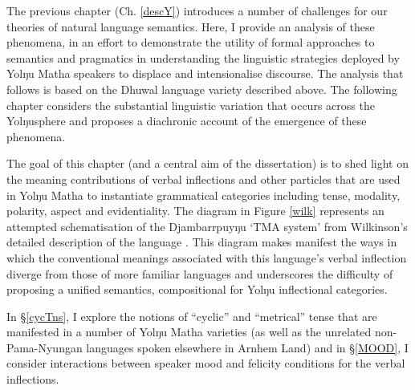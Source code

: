 \documentclass[11pt,dvipsnames]{report}
\date{}
\begin{document}
	
	The previous chapter (Ch. \ref{descY}) introduces a number of challenges for our theories of natural language semantics. Here, I provide an analysis of these phenomena, in an effort to demonstrate the utility of formal approaches to semantics and pragmatics in understanding the linguistic strategies deployed by Yolŋu Matha speakers to displace and intensionalise discourse. The analysis that follows is based on the Dhuwal language variety described above. The following chapter considers the substantial linguistic variation that occurs across the Yolŋusphere and proposes a diachronic account of the emergence of these phenomena.

The goal of this chapter (and a central aim of the dissertation) is to shed light on the meaning contributions of verbal inflections and other particles that are used in Yolŋu Matha to instantiate grammatical categories including tense, modality, polarity, aspect and evidentiality. The diagram in Figure \ref{wilk} represents an attempted schematisation of the Djambarrpuyŋu `TMA system' from Wilkinson's detailed description of the language \citeyearpar[362]{Wilkinson1991}. This diagram makes manifest the ways in which the conventional meanings associated with this language's verbal inflection diverge from those of more familiar languages and underscores the difficulty of proposing a unified semantics, compositional for Yolŋu inflectional categories.

In §\ref{cycTns}, I explore the notions of ``cyclic'' and ``metrical'' tense that are manifested in a number of Yolŋu Matha varieties (as well as the unrelated non-Pama-Nyungan languages spoken elsewhere in Arnhem Land) and in §\ref{MOOD}, I consider interactions between speaker mood and felicity conditions for the verbal inflections.


	




%
\end{document}
